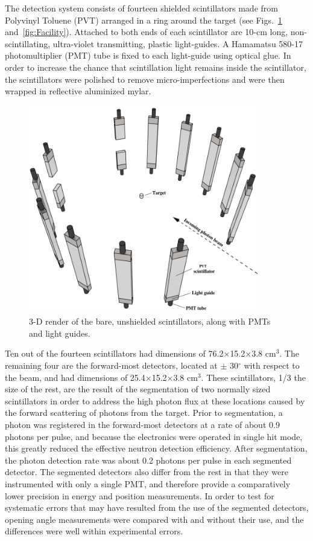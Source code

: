 The detection system consists of fourteen shielded scintillators made from Polyvinyl Toluene (PVT) arranged in a ring around the target (see Figs.~\ref{fig:DetGeom} and~\ref{fig:Facility}).
Attached to both ends of each scintillator are 10-cm long, non-scintillating, ultra-violet transmitting, plastic light-guides.
A Hamamatsu 580-17 photomultiplier (PMT) tube is fixed to each light-guide using optical glue.
In order to increase the chance that scintillation light remains inside the scintillator, the scintillators were polished to remove micro-imperfections and were then wrapped in reflective aluminized mylar.

\begin{figure}[]
    \centering
    \includegraphics[width = 0.9\textwidth]{Content/Methods/Detectors.png}
    \caption{3-D render of the bare, unshielded scintillators, along with PMTs and light guides.}
    \label{fig:DetGeom}
\end{figure}

Ten out of the fourteen scintillators had dimensions of 76.2$\times$15.2$\times$3.8 cm$^3$.
The remaining four are the forward-most detectors, located at $\pm$ 30$^{\circ}$ with respect to the beam, and had dimensions of 25.4$\times$15.2$\times$3.8 cm$^3$.
These scintillators, 1/3 the size of the rest, are the result of the segmentation of two normally sized scintillators in order to address the high photon flux at these locations caused by the forward scattering of photons from the target.
Prior to segmentation, a photon was registered in the forward-most detectors at a rate of about 0.9 photons per pulse, and because the electronics were operated in single hit mode, this greatly reduced the effective neutron detection efficiency.
After segmentation, the photon detection rate was about 0.2 photons per pulse in each segmented detector.
The segmented detectors also differ from the rest in that they were instrumented with only a single PMT, and therefore provide a comparatively lower precision in energy and position measurements.
In order to test for systematic errors that may have resulted from the use of the segmented detectors, opening angle measurements were compared with and without their use, and the differences were well within experimental errors.

